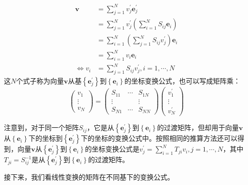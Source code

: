 \documentclass[main.tex]{subfiles}
\begin{document}
\begin{align*}
\mathbf{v}&=\sum_{j=1}^Nv^\prime_j\mathbf{e}^\prime_j\\
&=\sum_{j=1}^Nv^\prime_j\left(\sum_{i=1}^NS_{ij}\mathbf{e}_i\right)\\
&=\sum_{i=1}^N\left(\sum_{j=1}^N S_{ij}v^\prime_j\right)\mathbf{e}_i\\
&=\sum_{i=1}^Nv_i\mathbf{e}_i\\
\Leftrightarrow v_i&=\sum_{j=1}^NS_{ij}v^\prime_j,i=1,\cdots,N
\end{align*}
这$N$个式子称为向量$\mathbf{v}$从基$\left\{\mathbf{e}^\prime_j\right\}$到$\left\{\mathbf{e}_i\right\}$的坐标变换公式，也可以写成矩阵乘：
\[\left(\begin{array}{c}v_1\\\vdots\\v_N\end{array}\right)=\left(\begin{array}{ccc}S_{11}&\cdots&S_{1N}\\\vdots&&\vdots\\S_{N1}&\cdots&S_{NN}\end{array}\right)\left(\begin{array}{c}v^\prime_1\\\vdots\\v^\prime_N\end{array}\right)\]

注意到，对于同一个矩阵$S_{ij}$，它是从$\left\{\mathbf{e}^\prime_j\right\}$到$\left\{\mathbf{e}_i\right\}$的过渡矩阵，但却用于向量$\mathbf{v}$从$\left\{\mathbf{e}_i\right\}$下的坐标到$\left\{\mathbf{e}^\prime_j\right\}$下的坐标的变换公式中。按照相同的推算方法还可以得到，向量$\mathbf{v}$从$\left\{\mathbf{e}^\prime_j\right\}$到$\left\{\mathbf{e}_i\right\}$的坐标变换公式是$v^\prime_j=\sum_{i=1}^NT_{ji}v_i,j=1,\cdots,N$，其中$T_{ji}=S_{ij}^{-1}$是从$\left\{\mathbf{e}^\prime_j\right\}$到$\left\{\mathbf{e}_i\right\}$的过渡矩阵。

接下来，我们看线性变换的矩阵在不同基下的变换公式。
\end{document}
